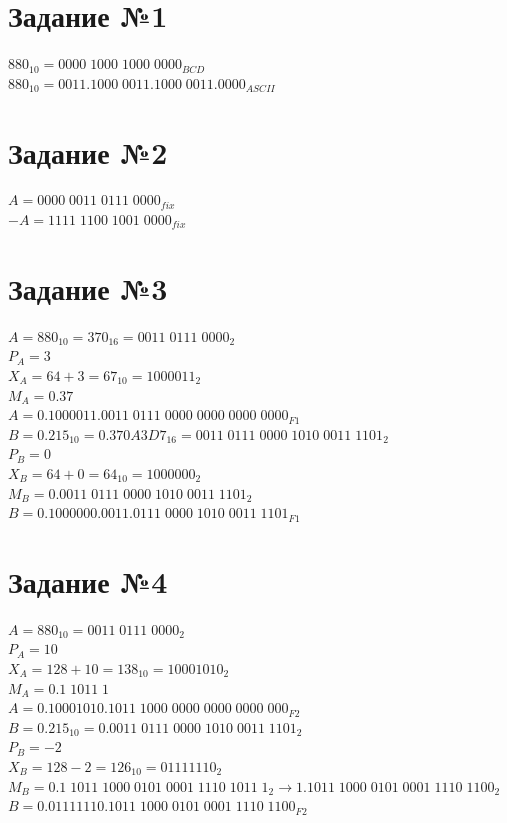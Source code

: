 \documentclass[12pt,a4paper]{report}
\begin{document}
\section*{Задание №1}
$880_{10}=0000\;1000\;1000\;0000_{BCD}$\\
$880_{10}=0011.1000\;0011.1000\;0011.0000_{ASCII}$
\section*{Задание №2}
$A=0000\;0011\;0111\;0000_{fix}$\\
$-A=1111\;1100\;1001\;0000_{fix}$
\section*{Задание №3}
$A=880_{10}=370_{16}=0011\;0111\;0000_2$\\
$P_A=3$\\
$X_A=64+3=67_{10}=1000011_2$\\
$M_A=0.37$\\
$A=0.1000011.0011\;0111\;0000\;0000\;0000\;0000_{F1}$\\
\hfill\break
$B=0.215_{10}=0.370A3D7_{16}=0011\;0111\;0000\;1010\;0011\;1101_2$\\
$P_B=0$\\
$X_B=64+0=64_{10}=1000000_2$\\
$M_B=0.0011\;0111\;0000\;1010\;0011\;1101_2$\\
$B=0.1000000.0011.0111\;0000\;1010\;0011\;1101_{F1}$
\section*{Задание №4}
$A=880_{10}=0011\;0111\;0000_2$\\
$P_A=10$\\
$X_A=128+10=138_{10}=10001010_{2}$\\
$M_A=0.1\;1011\;1$\\
$A=0.10001010.1011\;1000\;0000\;0000\;0000\;000_{F2}$\\
\hfill\break
$B=0.215_{10}=0.0011\;0111\;0000\;1010\;0011\;1101_2$\\
$P_B=-2$\\
$X_B=128-2=126_{10}=01111110_2$\\
$M_B=0.1\;1011\;1000\;0101\;0001\;1110\;1011\;1_2\rightarrow1.1011\;1000\;0101\;0001\;1110\;1100_2$\\
$B=0.01111110.1011\;1000\;0101\;0001\;1110\;1100_{F2}$
\end{document}
